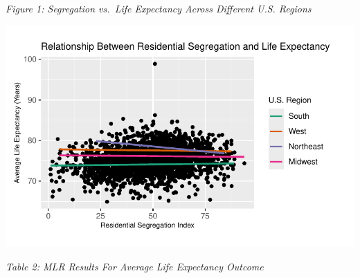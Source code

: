 \documentclass[
  10pt,
  letterpaper,
  DIV=11,
  numbers=noendperiod]{scrartcl}
\begin{document}
\emph{Figure 1: Segregation vs.~Life Expectancy Across Different U.S.
Regions}

\includegraphics{paper_files/figure-pdf/unnamed-chunk-10-1.pdf}

\newpage

\emph{Table 2: MLR Results For Average Life Expectancy Outcome}
\end{document}
